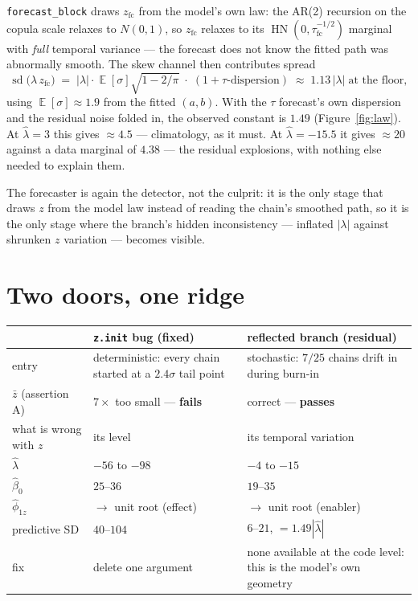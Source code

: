 \documentclass[11pt]{article}
\newcommand{\code}[1]{\texttt{#1}}
\DeclareMathOperator{\hn}{HN}
\DeclareMathOperator{\sd}{sd}
\DeclareMathOperator{\E}{\mathbb{E}}
\begin{document}
\code{forecast\_block} draws $z_{\text{fc}}$ from the model's own law: the
AR(2) recursion on the copula scale relaxes to $N(0,1)$, so $z_{\text{fc}}$
relaxes to its $\hn(0, \tau_{\text{fc}}^{-1/2})$ marginal with
\emph{full} temporal variance --- the forecast does not know the fitted path
was abnormally smooth. The skew channel then contributes spread
\begin{equation}
  \sd\!\big(\lambda\, z_{\text{fc}}\big)
  \;=\; |\lambda| \cdot \E[\sigma] \sqrt{1 - 2/\pi} \;\cdot\; (1 + \text{$\tau$-dispersion})
  \;\approx\; 1.13\,|\lambda| \;\text{at the floor},
\end{equation}
using $\E[\sigma] \approx 1.9$ from the fitted $(a, b)$. With the $\tau$
forecast's own dispersion and the residual noise folded in, the observed
constant is $1.49$ (Figure~\ref{fig:law}). At $\hat\lambda = 3$ this gives
$\approx 4.5$ --- climatology, as it must. At $\hat\lambda = -15.5$ it gives
$\approx 20$ against a data marginal of $4.38$ --- the residual explosions,
with nothing else needed to explain them.

The forecaster is again the detector, not the culprit: it is the only stage
that draws $z$ from the model law instead of reading the chain's smoothed
path, so it is the only stage where the branch's hidden inconsistency ---
inflated $|\lambda|$ against shrunken $z$ variation --- becomes visible.

\section{Two doors, one ridge}

\begin{center}
\begin{tabular}{p{}p{}p{}}
\toprule
 & \code{z.init} bug (fixed) & reflected branch (residual) \\
\midrule
entry & deterministic: every chain started at a $2.4\sigma$ tail point &
stochastic: $7/25$ chains drift in during burn-in \\
$\bar z$ (assertion A) & $7\times$ too small --- \textbf{fails} &
correct --- \textbf{passes} \\
what is wrong with $z$ & its level & its temporal variation \\
$\hat\lambda$ & $-56$ to $-98$ & $-4$ to $-15$ \\
$\hat\beta_0$ & $25$--$36$ & $19$--$35$ \\
$\hat\phi_{1z}$ & $\to$ unit root (effect) & $\to$ unit root (enabler) \\
predictive SD & $40$--$104$ & $6$--$21$, $= 1.49|\hat\lambda|$ \\
fix & delete one argument & none available at the code level:
this is the model's own geometry \\
\bottomrule
\end{tabular}
\end{center}
\end{document}
